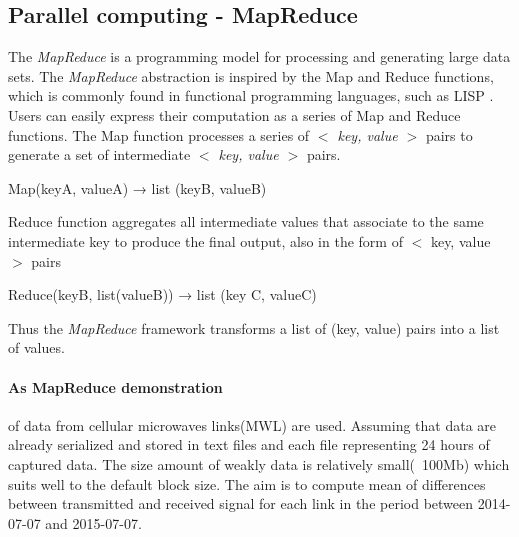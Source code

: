 \documentclass[a4paper,12pt,oneside]{report}
\begin{document}
	\subsection{Parallel computing - MapReduce}		
The \emph{MapReduce} is a programming model for processing and generating large data
sets. The \emph{MapReduce} abstraction is inspired by the Map and Reduce functions, which is commonly
found in functional programming languages, such as LISP \cite{lisp}. Users can easily express their
computation as a series of Map and Reduce functions. The Map function processes a series of
\textit{$<$ key, value $>$} pairs to generate a set of intermediate \textit{$<$ key, value $>$} pairs.
\begin{center}
Map(keyA, valueA) → list (keyB, valueB)
\end{center}
Reduce function aggregates all intermediate values that associate to the same intermediate key
to produce the final output, also in the form of $<$ key, value $>$ pairs
\begin{center}
Reduce(keyB, list(valueB)) → list (key C, valueC)
\end{center}
Thus the \emph{MapReduce} framework transforms a list of (key, value) pairs into a list of values. 


\paragraph{As MapReduce demonstration} of  data from cellular microwaves links(MWL) are used.
Assuming that data are already serialized and stored in text files and each file representing 24 hours 
of captured data. The size amount of weakly data is relatively small(~100Mb) which suits well to the default block size.
The aim is to compute  mean of differences between transmitted and received signal for 
each link in the period between 2014-07-07 and 2015-07-07.
\end{document}
